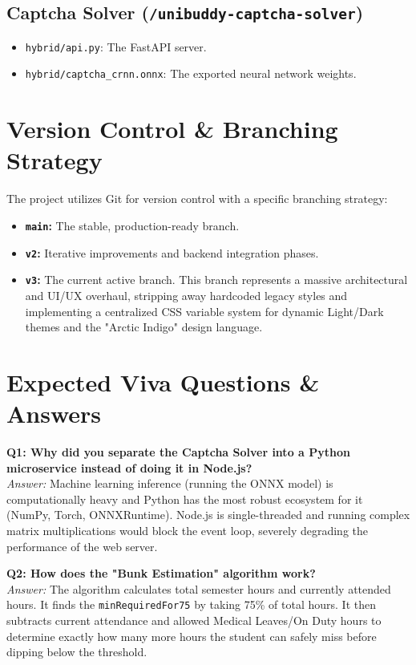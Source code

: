 \documentclass[11pt,a4paper]{article}
\begin{document}
\subsection{Captcha Solver (\texttt{/unibuddy-captcha-solver})}
\begin{itemize}
    \item \texttt{hybrid/api.py}: The FastAPI server.
    \item \texttt{hybrid/captcha\_crnn.onnx}: The exported neural network weights.
\end{itemize}

\section{Version Control \& Branching Strategy}
The project utilizes Git for version control with a specific branching strategy:
\begin{itemize}
    \item \textbf{\texttt{main}:} The stable, production-ready branch.
    \item \textbf{\texttt{v2}:} Iterative improvements and backend integration phases.
    \item \textbf{\texttt{v3}:} The current active branch. This branch represents a massive architectural and UI/UX overhaul, stripping away hardcoded legacy styles and implementing a centralized CSS variable system for dynamic Light/Dark themes and the "Arctic Indigo" design language.
\end{itemize}

\section{Expected Viva Questions \& Answers}

\textbf{Q1: Why did you separate the Captcha Solver into a Python microservice instead of doing it in Node.js?} \\
\textit{Answer:} Machine learning inference (running the ONNX model) is computationally heavy and Python has the most robust ecosystem for it (NumPy, Torch, ONNXRuntime). Node.js is single-threaded and running complex matrix multiplications would block the event loop, severely degrading the performance of the web server.

\textbf{Q2: How does the "Bunk Estimation" algorithm work?} \\
\textit{Answer:} The algorithm calculates total semester hours and currently attended hours. It finds the \texttt{minRequiredFor75} by taking 75\% of total hours. It then subtracts current attendance and allowed Medical Leaves/On Duty hours to determine exactly how many more hours the student can safely miss before dipping below the threshold.
\end{document}
